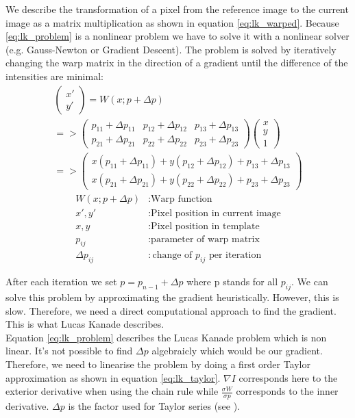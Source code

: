 \documentclass[11pt,a4paper,titlepage,oneside]{report}
\begin{document}
We describe the transformation of a pixel from the reference image to the current image as a matrix multiplication as shown in equation \ref{eq:lk_warped}. Because \ref{eq:lk_problem} is a nonlinear problem we have to solve it with a nonlinear solver (e.g. Gauss-Newton or Gradient Descent). The problem is solved by iteratively changing the warp matrix in the direction of a gradient until the difference of the intensities are minimal:
\begin{equation}\label{eq:lk_warped}
	\begin{gathered}
		\begin{pmatrix}
			x' \\
			y'
		\end{pmatrix}=
		W(x;p+\Delta p)\\
		=>
		\begin{pmatrix}
			p_{11}+\Delta p_{11} & p_{12}+\Delta p_{12} & p_{13}+\Delta p_{13} \\
			p_{21}+\Delta p_{21} & p_{22}+\Delta p_{22} & p_{23}+\Delta p_{23}
		\end{pmatrix}
		\begin{pmatrix}
			x\\
			y\\
			1
		\end{pmatrix}\\
		=>
		\begin{pmatrix}
			x(p_{11}+\Delta p_{11}) + y(p_{12}+\Delta p_{12}) + p_{13}+\Delta p_{13} \\
			x(p_{21}+\Delta p_{21}) + y(p_{22}+\Delta p_{22}) + p_{23}+\Delta p_{23}
		\end{pmatrix}
	\end{gathered}
\end{equation}
\begin{align*}
	W(x;p+\Delta p)	&:	\text{Warp function}\\
	x',y'						&:	\text{Pixel position in current image}\\
	x,y							&:	\text{Pixel position in template}\\
	p_{ij}					&:	\text{parameter of warp matrix}\\
	\Delta p_{ij}		&:	\text{change of $p_{ij}$ per iteration}
\end{align*}

After each iteration we set $p=p_{n-1}+\Delta p$ where p stands for all $p_{ij}$. We can solve this problem by approximating the gradient heuristically. However, this is slow. Therefore, we need a direct computational approach to find the gradient. This is what Lucas Kanade describes. \\
Equation \ref{eq:lk_problem} describes the Lucas Kanade problem which is non linear. It's not possible to find $\Delta p$ algebraicly which would be our gradient. Therefore, we need to linearise the problem by doing a first order Taylor approximation as shown in equation \ref{eq:lk_taylor}. $\nabla I$ corresponds here to the exterior derivative when using the chain rule while $\frac{\sigma W}{\sigma p}$ corresponds to the inner derivative. $\Delta p$ is the factor used for Taylor series (see \cite{taylor_series}).
\end{document}
